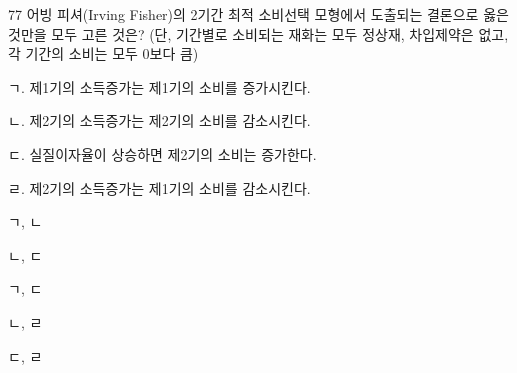 \begin{question}{77}
어빙 피셔(Irving Fisher)의 2기간 최적 소비선택 모형에서 도출되는 결론으로 옳은 것만을 모두 고른 것은? (단, 기간별로 소비되는 재화는 모두 정상재, 차입제약은 없고, 각 기간의 소비는 모두 0보다 큼)
\begin{framedtext}
ㄱ. 제1기의 소득증가는 제1기의 소비를 증가시킨다. \par
ㄴ. 제2기의 소득증가는 제2기의 소비를 감소시킨다. \par
ㄷ. 실질이자율이 상승하면 제2기의 소비는 증가한다. \par
ㄹ. 제2기의 소득증가는 제1기의 소비를 감소시킨다.
\end{framedtext}
\begin{choices}
  \item ㄱ, ㄴ
  \item ㄴ, ㄷ
  \item ㄱ, ㄷ
  \item ㄴ, ㄹ
  \item ㄷ, ㄹ
\end{choices}
\end{question}
\answerall
{}

